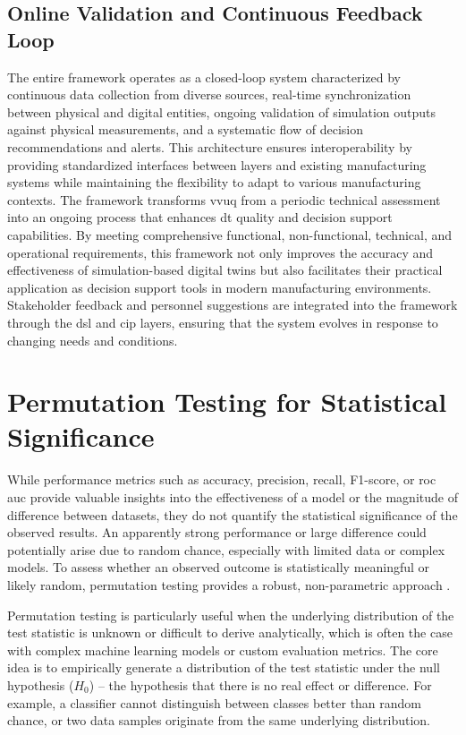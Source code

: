 \subsection{Online Validation and Continuous Feedback Loop}
\label{sec:online-validation}
The entire framework operates as a closed-loop system characterized by continuous data collection from diverse sources, real-time synchronization between physical and digital entities, ongoing validation of simulation outputs against physical measurements, and a systematic flow of decision recommendations and alerts. This architecture ensures interoperability by providing standardized interfaces between layers and existing manufacturing systems while maintaining the flexibility to adapt to various manufacturing contexts. The framework transforms \gls{vvuq} from a periodic technical assessment into an ongoing process that enhances \gls{dt} quality and decision support capabilities. By meeting comprehensive functional, non-functional, technical, and operational requirements, this framework not only improves the accuracy and effectiveness of simulation-based digital twins but also facilitates their practical application as decision support tools in modern manufacturing environments. Stakeholder feedback and personnel suggestions are integrated into the framework through the \gls{dsl} and \gls{cip} layers, ensuring that the system evolves in response to changing needs and conditions.

\section{Permutation Testing for Statistical Significance}
\label{sec:permtest}

While performance metrics such as accuracy, precision, recall, F1-score, or \gls{roc} \gls{auc} provide valuable insights into the effectiveness of a model or the magnitude of difference between datasets, they do not quantify the statistical significance of the observed results. An apparently strong performance or large difference could potentially arise due to random chance, especially with limited data or complex models. To assess whether an observed outcome is statistically meaningful or likely random, permutation testing provides a robust, non-parametric approach \autocite{welch1990construction}.

Permutation testing is particularly useful when the underlying distribution of the test statistic is unknown or difficult to derive analytically, which is often the case with complex machine learning models or custom evaluation metrics. The core idea is to empirically generate a distribution of the test statistic under the null hypothesis ($H_0$) – the hypothesis that there is no real effect or difference. For example, a classifier cannot distinguish between classes better than random chance, or two data samples originate from the same underlying distribution.

